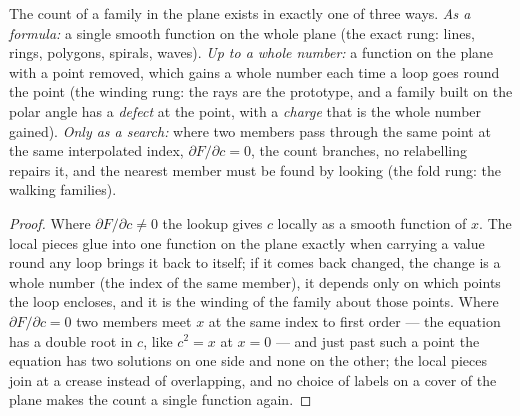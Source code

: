 \begin{theorem}[Trichotomy]
\label{thm:trichotomy}
The count of a family in the plane exists in exactly one of three ways.
\emph{As a formula:} a single smooth function on the whole plane (the exact
rung: lines, rings, polygons, spirals, waves). \emph{Up to a whole number:}
a function on the plane with a point removed, which gains a whole number
each time a loop goes round the point (the winding rung: the rays are the
prototype, and a family built on the polar angle has a \emph{defect} at
the point, with a \emph{charge} that is the whole number gained). \emph{Only
as a search:} where two members pass through the same point at the same
interpolated index, $\partial F/\partial c=0$, the count branches, no
relabelling repairs it, and the nearest member must be found by looking
(the fold rung: the walking families).
\end{theorem}

\begin{proof}
Where $\partial F/\partial c\ne0$ the lookup gives $c$ locally as a smooth
function of $x$. The local pieces glue into one function on the plane
exactly when carrying a value round any loop brings it back to itself; if
it comes back changed, the change is a whole number (the index of the same
member), it depends only on which points the loop encloses, and it is the
winding of the family about those points. Where $\partial F/\partial c=0$
two members meet $x$ at the same index to first order --- the equation has
a double root in $c$, like $c^2=x$ at $x=0$ --- and just past such a point
the equation has two solutions on one side and none on the other; the
local pieces join at a crease instead of overlapping, and no choice of
labels on a cover of the plane makes the count a single function again.
\end{proof}

